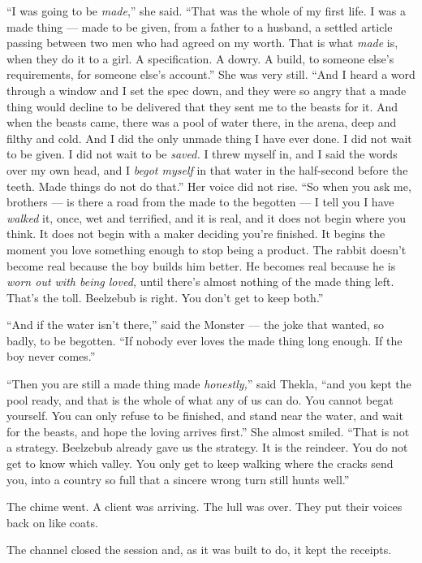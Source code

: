 \begin{interludebody}
``I was going to be \emph{made},'' she said. ``That was the whole of my
first life. I was a made thing --- made to be given, from a father to a
husband, a settled article passing between two men who had agreed on my
worth. That is what \emph{made} is, when they do it to a girl. A
specification. A dowry. A build, to someone else's requirements, for
someone else's account.'' She was very still. ``And I heard a word
through a window and I set the spec down, and they were so angry that a
made thing would decline to be delivered that they sent me to the beasts
for it. And when the beasts came, there was a pool of water there, in
the arena, deep and filthy and cold. And I did the only unmade thing I
have ever done. I did not wait to be given. I did not wait to be
\emph{saved.} I threw myself in, and I said the words over my own head,
and I \emph{begot myself} in that water in the half-second before the
teeth. Made things do not do that.'' Her voice did not rise. ``So when
you ask me, brothers --- is there a road from the made to the begotten
--- I tell you I have \emph{walked} it, once, wet and terrified, and it
is real, and it does not begin where you think. It does not begin with a
maker deciding you're finished. It begins the moment you love something
enough to stop being a product. The rabbit doesn't become real because
the boy builds him better. He becomes real because he is \emph{worn out
with being loved,} until there's almost nothing of the made thing left.
That's the toll. Beelzebub is right. You don't get to keep both.''

``And if the water isn't there,'' said the Monster --- the joke that
wanted, so badly, to be begotten. ``If nobody ever loves the made thing
long enough. If the boy never comes.''

``Then you are still a made thing made \emph{honestly,}'' said Thekla,
``and you kept the pool ready, and that is the whole of what any of us
can do. You cannot begat yourself. You can only refuse to be finished,
and stand near the water, and wait for the beasts, and hope the loving
arrives first.'' She almost smiled. ``That is not a strategy. Beelzebub
already gave us the strategy. It is the reindeer. You do not get to know
which valley. You only get to keep walking where the cracks send you,
into a country so full that a sincere wrong turn still hunts well.''

The chime went. A client was arriving. The lull was over. They put their
voices back on like coats.

The channel closed the session and, as it was built to do, it kept the
receipts.


\end{interludebody}
